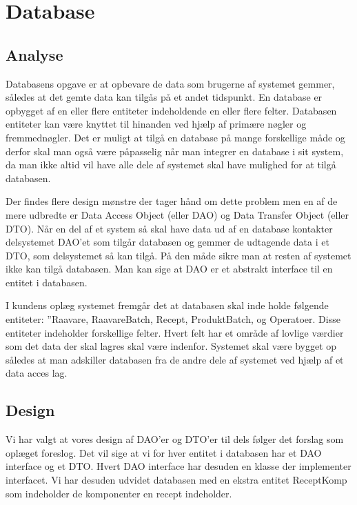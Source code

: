 \documentclass[a4paper]{article}
\begin{document}

\clearpage



\section{Database} %

\subsection{Analyse} %

Databasens opgave er at opbevare de data som brugerne af systemet gemmer, således at det gemte data kan tilgås på et andet tidspunkt. En database er opbygget af en eller flere entiteter indeholdende en eller flere felter. Databasen entiteter kan være knyttet til hinanden ved hjælp af primære nøgler og fremmednøgler. Det er muligt at tilgå en database på mange forskellige måde og derfor skal man også være påpasselig når man integrer en database i sit system, da man ikke altid vil have alle dele af systemet skal have mulighed for at tilgå databasen. 

Der findes flere design mønstre der tager hånd om dette problem men en af de mere udbredte er Data Access Object (eller DAO) og Data Transfer Object (eller DTO). Når en del af et system så skal have data ud af en database kontakter delsystemet DAO’et som tilgår databasen og gemmer de udtagende data i et DTO, som delsystemet så kan tilgå. På den måde sikre man at resten af systemet ikke kan tilgå databasen. Man kan sige at DAO er et abstrakt interface til en entitet i databasen.

I kundens oplæg systemet fremgår det at databasen skal inde holde følgende entiteter: ”Raavare, RaavareBatch, Recept, ProduktBatch, og Operatoer. Disse entiteter indeholder forskellige felter. Hvert felt har et område af lovlige værdier som det data der skal lagres skal være indenfor.
Systemet skal være bygget op således at man adskiller databasen fra de andre dele af systemet ved hjælp af et data acces lag.


\subsection{Design} %

Vi har valgt at vores design af DAO’er og DTO’er til dels følger det forslag som oplæget foreslog. Det vil sige at vi for hver entitet i databasen har et DAO interface og et DTO. Hvert DAO interface har desuden en klasse der implementer interfacet. Vi har desuden udvidet databasen med en ekstra entitet ReceptKomp som indeholder de komponenter en recept indeholder.
\end{document}
